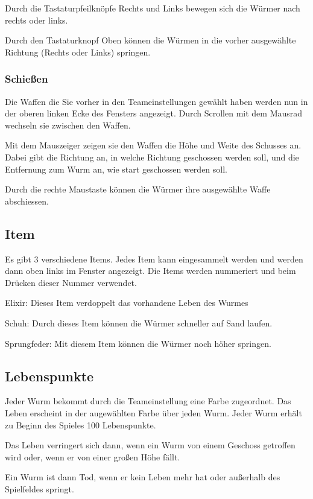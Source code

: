 \documentclass{scrreprt}
\begin{document}
Durch die Tastaturpfeilknöpfe Rechts und Links bewegen sich die Würmer nach rechts oder links.

Durch den Tastaturknopf Oben können die Würmen in die vorher ausgewählte Richtung (Rechts oder Links) springen.

\subsubsection{Schießen}

Die Waffen die Sie vorher in den Teameinstellungen gewählt haben werden nun in der oberen linken Ecke des Fensters angezeigt.
Durch Scrollen mit dem Mausrad wechseln sie zwischen den Waffen.

Mit dem Mauszeiger zeigen sie den Waffen die Höhe und Weite des Schusses an. Dabei gibt die Richtung an, in welche Richtung
geschossen werden soll, und die Entfernung zum Wurm an, wie start geschossen werden soll.

Durch die rechte Maustaste können die Würmer ihre ausgewählte Waffe abschiessen.

\subsection{Item}

Es gibt 3 verschiedene Items. Jedes Item kann eingesammelt werden und werden dann oben links im Fenster angezeigt.
Die Items werden nummeriert und beim Drücken dieser Nummer verwendet. 

Elixir: Dieses Item verdoppelt das vorhandene Leben des Wurmes

Schuh: Durch dieses Item können die Würmer schneller auf Sand laufen.

Sprungfeder: Mit diesem Item können die Würmer noch höher springen.

\subsection{Lebenspunkte}

Jeder Wurm bekommt durch die Teameinstellung eine Farbe zugeordnet. Das Leben erscheint in der augewählten Farbe über jeden
Wurm. Jeder Wurm erhält zu Beginn des Spieles 100 Lebenspunkte.

Das Leben verringert sich dann, wenn ein Wurm von einem Geschoss getroffen wird oder, wenn er von einer großen Höhe fällt.

Ein Wurm ist dann Tod, wenn er kein Leben mehr hat oder außerhalb des Spielfeldes springt.
\end{document}
